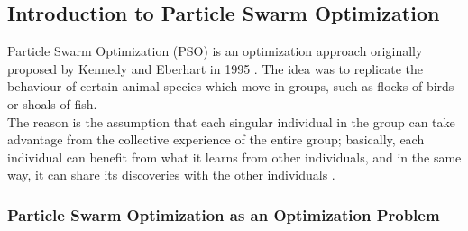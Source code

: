 \subsection{Introduction to Particle Swarm Optimization}

Particle Swarm Optimization (PSO) is an optimization approach originally proposed by Kennedy and Eberhart in 1995 \cite{Tesi-3.3}. The idea was to replicate the behaviour of certain animal species which move in groups, such as flocks of birds or shoals of fish.
\\[0.3cm]The reason is the assumption that each singular individual in the group can take advantage from the collective experience of the entire group; basically, each individual can benefit from what it learns from other individuals, and in the same way, it can share its discoveries with the other individuals \cite{Tesi-3.1}.

\subsubsection{Particle Swarm Optimization as an Optimization Problem}

